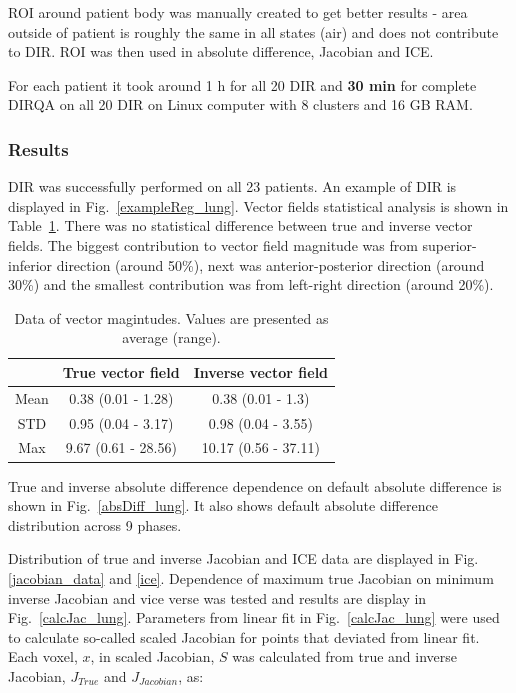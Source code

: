 \documentclass[type=dr, dr=rernat, accentcolor=tud7b,colorbacktitle, bigchapter, openright, twoside, 12pt ]{tudthesis}
\begin{document}
ROI around patient body was manually created to get better results - area outside of patient is roughly the same in all states (air) and does not contribute to DIR. ROI was then used in absolute difference, Jacobian and ICE.

For each patient it took around 1 h for all 20 DIR and \textbf{30 min} for complete DIRQA on all 20 DIR on Linux computer with 8 clusters and 16 GB RAM.


\subsubsection{Results}

DIR was successfully performed on all 23 patients. An example of DIR is displayed in Fig.~\ref{exampleReg_lung}. Vector fields statistical analysis is shown in Table~\ref{tab:vectordata_lung}. There was no statistical
difference between true and inverse vector fields. The biggest contribution to vector field magnitude was from superior-inferior direction (around 50\%), next was anterior-posterior direction (around 30\%) and the smallest contribution was from left-right direction (around 20\%).

\begin{table}[H]
  \centering
  \caption{Data of vector magintudes. Values are presented as average (range).}
  \begin{tabular}{c|c|c}
  
       & True vector field & Inverse vector field  \\
       \hline
       Mean & 0.38 (0.01 - 1.28) & 0.38 (0.01 - 1.3) \\ 
       STD & 0.95 (0.04 - 3.17) & 0.98 (0.04 - 3.55) \\ 
       Max & 9.67 (0.61 - 28.56) & 10.17 (0.56 - 37.11) \\
    \hline\hline
  \end{tabular}
  \label{tab:vectordata_lung}
\end{table}

True and inverse absolute difference dependence on default absolute difference is shown in Fig.~\ref{absDiff_lung}. It also shows default absolute difference distribution across 9 phases. 

Distribution of true and inverse Jacobian and ICE data are displayed in Fig. \ref{jacobian_data} and \ref{ice}. Dependence of maximum true Jacobian on minimum inverse Jacobian and vice verse was tested and results are display in Fig.~\ref{calcJac_lung}. Parameters from linear fit in Fig.~\ref{calcJac_lung} were used to calculate so-called scaled Jacobian for points that deviated from linear fit. Each voxel, $x$, in scaled Jacobian, $S$ was calculated from true and inverse Jacobian, $J_{True}$ and $J_{Jacobian}$, as:
\end{document}
